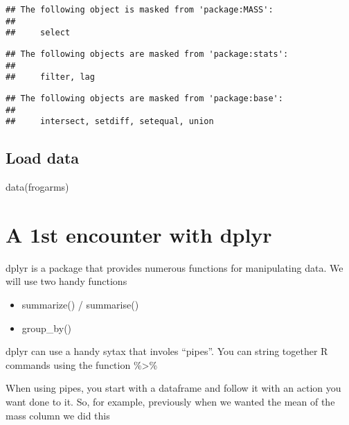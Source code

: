 \documentclass[
]{book}
\newenvironment{Shaded}{\begin{snugshade}}{\end{snugshade}}
\newcommand{\FunctionTok}[1]{\textcolor[rgb]{0.00,0.00,0.00}{#1}}
\newcommand{\NormalTok}[1]{#1}
\newcommand{\SpecialCharTok}[1]{\textcolor[rgb]{0.00,0.00,0.00}{#1}}
\providecommand{\tightlist}{%
  \setlength{\itemsep}{0pt}\setlength{\parskip}{0pt}}
\begin{document}
\begin{verbatim}
## The following object is masked from 'package:MASS':
## 
##     select
\end{verbatim}

\begin{verbatim}
## The following objects are masked from 'package:stats':
## 
##     filter, lag
\end{verbatim}

\begin{verbatim}
## The following objects are masked from 'package:base':
## 
##     intersect, setdiff, setequal, union
\end{verbatim}

\hypertarget{load-data-5}{%
\subsection{Load data}\label{load-data-5}}

\begin{Shaded}
\begin{Highlighting}[]
\FunctionTok{data}\NormalTok{(frogarms)}
\end{Highlighting}
\end{Shaded}

\hypertarget{a-1st-encounter-with-dplyr}{%
\section{A 1st encounter with dplyr}\label{a-1st-encounter-with-dplyr}}

dplyr is a package that provides numerous functions for manipulating data. We will use two handy functions

\begin{itemize}
\tightlist
\item
  summarize() / summarise()
\item
  group\_by()
\end{itemize}

dplyr can use a handy sytax that involes ``pipes''. You can string together R commands using the function \%\textgreater\%

When using pipes, you start with a dataframe and follow it with an action you want done to it. So, for example, previously when we wanted the mean of the mass column we did this

\begin{Shaded}
\end{Shaded}
\end{document}
